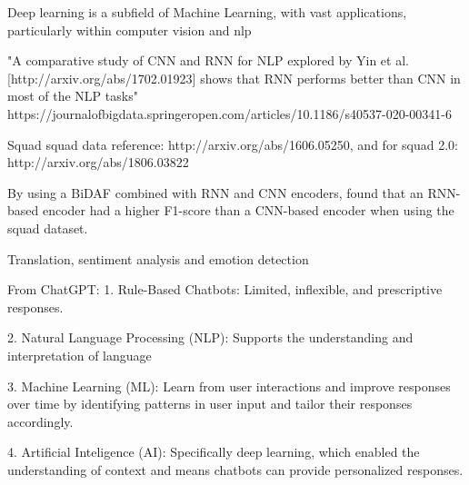 Deep learning is a subfield of Machine Learning, with vast applications, particularly within computer vision and \acrshort{nlp}

"A comparative study of CNN and RNN for NLP explored by Yin et  al. [http://arxiv.org/abs/1702.01923] shows that RNN performs better than CNN in most of the NLP tasks" https://journalofbigdata.springeropen.com/articles/10.1186/s40537-020-00341-6


Squad \acrshort{squad} data reference: http://arxiv.org/abs/1606.05250, and for squad 2.0: http://arxiv.org/abs/1806.03822

By using a BiDAF combined with RNN and CNN encoders, \citep{Budiharto} found that an RNN-based encoder had a higher F1-score than a CNN-based encoder when using the \acrshort{squad} dataset.

Translation, sentiment analysis and emotion detection \citep{Hirschberg}



From ChatGPT:
1. Rule-Based Chatbots: Limited, inflexible, and prescriptive responses.

2. Natural Language Processing (NLP): Supports the understanding and interpretation of language

3. Machine Learning (ML): Learn from user interactions and improve responses over time by identifying patterns in user input and tailor their responses accordingly.

4. Artificial Inteligence (AI): Specifically deep learning, which enabled the understanding of context and means chatbots can provide personalized responses.